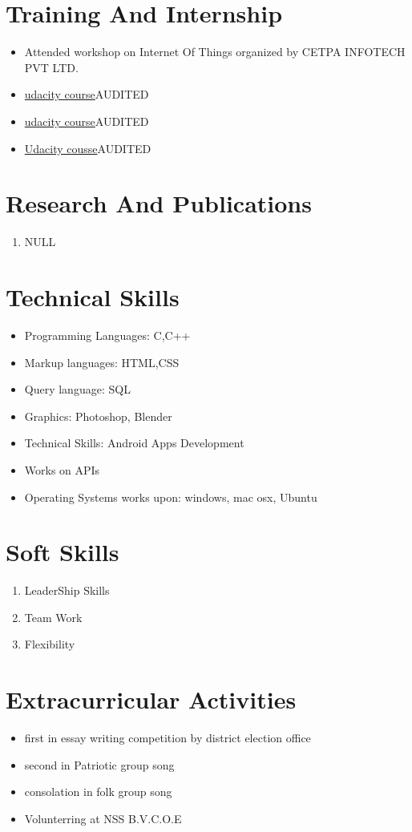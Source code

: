 \documentclass{article}
\begin{document}
\section{Training And Internship}
\begin{itemize}
\item {Attended workshop on Internet Of Things organized by CETPA INFOTECH PVT LTD.}
\item \href{https://classroom.udacity.com/courses/ud836}{udacity course}{AUDITED}
\item \href{https://classroom.udacity.com/courses/ud839}{udacity course}{AUDITED}
\item \href{https://classroom.udacity.com/courses/ud834}{Udacity cousse}{AUDITED}
\end{itemize}
\section{Research And Publications}
\begin{enumerate}
\item {NULL}
\end{enumerate}
\section{Technical Skills}
\begin{itemize}
\item {Programming Languages: C,C++}
\item {Markup languages: HTML,CSS}
\item {Query language: SQL}
\item {Graphics: Photoshop, Blender}
\item {Technical Skills: Android Apps Development}
\item {Works on APIs}
\item {Operating Systems works upon: windows, mac osx, Ubuntu}
\end{itemize}
\section{Soft Skills}
\begin{enumerate}
\item {LeaderShip Skills}
\item {Team Work}
\item {Flexibility}
\end{enumerate}
\section{Extracurricular Activities}
\begin{itemize}
\item { first in essay writing competition by district election office }
\item { second in Patriotic group song}
\item { consolation in folk group song}
\item { Volunterring at NSS B.V.C.O.E}
\end{itemize}
\end{document}
